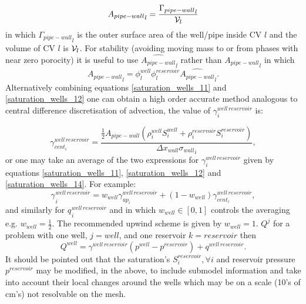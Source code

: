 \begin{equation}
{A_{pipe-wall}}_l =  \frac{  {\Gamma_{pipe-wall}}_l  }{ {\cal V}_l }
\label{saturation_wells_12b}
\end{equation}
in which ${\Gamma_{pipe-wall}}_l$ is the outer surface area of the well/pipe inside CV $l$
and the volume of CV $l$ is ${\cal V}_l$.
For stability (avoiding moving mass to or from phases with near zero porocity) it is useful to use $\widehat{A_{pipe-wall}}_l$ rather than ${A_{pipe-wall}}_l$ in which
\begin{equation}
{A_{pipe-wall}}_l =  \phi^{well}_l \phi^{reservoir}_l \widehat{ A_{pipe-wall}}_l.
\label{saturation_wells_12b-hat}
\end{equation}
Alternatively combining equations \ref{saturation_wells_11} and \ref{saturation_wells_12}
one can obtain a high order accurate method analogous to central difference discretisation
of advection, the value of $\gamma_i^{well\, reservoir}$ is:

\begin{equation}
\gamma_{cent_i}^{well\, reservoir}=
\frac{\frac{1}{2} A_{pipe-wall}  (\rho_i^{well}  S_i^{well} + \rho_i^{reservoir}  S_i^{reservoir}) }{{{\Delta x}_{wall}\sigma_{wall}}_i},
\label{saturation_wells_14}
\end{equation}
or one may take an average of the two expressions for $\gamma_i^{well\, reservoir}$ given by equations
\ref{saturation_wells_11}, \ref{saturation_wells_12} and
\ref{saturation_wells_14}. For example:
\begin{equation}
{\gamma_{}}_i^{well\, reservoir}=
w_{well}{\gamma_{up_i}^{well\, reservoir}}+
(1-w_{well}){\gamma_{cent_i}^{well\, reservoir}} ,
\label{saturation_wells_14b}
\end{equation}
and similarly for ${q_{}}_i^{well\, reservoir}$ and
in which $w_{well}\in\left[0,1\right]$ controls the averaging e.g. $w_{well}=\frac{1}{2}$.
The recommended upwind scheme is given by $w_{well}=1$.
$Q^j$ for a problem with one well, $j=well$, and one reservoir  $k=reservoir$ then
\begin{equation}
Q^{well}=\gamma^{well\, reservoir} (p^{well}-p^{reservoir}) + q^{well\, reservoir}.
\label{saturation_wells_14bb}
\end{equation}
It should be pointed out that the saturation's $S_i^{reservoir}, \forall i$ and
reservoir pressure $p^{reservoir}$ may be modified, in the above,
to include submodel information
and take into account their local changes around the wells which may be on a scale (10's of cm's)
not resolvable on the mesh.




